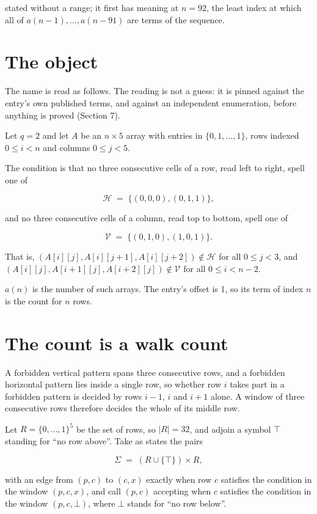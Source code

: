 \documentclass[11pt]{article}
\theoremstyle{definition}
\begin{document}
stated without a range; it first has meaning at $n = 92$, the least index at which all of $a(n-1),\dots,a(n-91)$ are terms of the sequence.

\section{The object}

The name is read as follows. The reading is not a guess: it is pinned against the entry's own published terms, and against an independent enumeration, before anything is proved (Section 7).

Let $q = 2$ and let $A$ be an $n \times 5$ array with entries in $\{0,1,\dots,1\}$, rows indexed $0 \le i < n$ and columns $0 \le j < 5$.

The condition is that no three consecutive cells of a row, read left to right, spell one of

\[\mathcal{H} \;=\; \{(0,0,0), (0,1,1)\},\]

and no three consecutive cells of a column, read top to bottom, spell one of

\[\mathcal{V} \;=\; \{(0,1,0), (1,0,1)\}.\]

That is, $(A[i][j],A[i][j{+}1],A[i][j{+}2]) \notin \mathcal{H}$ for all $0 \le j < 3$, and $(A[i][j],A[i{+}1][j],A[i{+}2][j]) \notin \mathcal{V}$ for all $0 \le i < n-2$.

$a(n)$ is the number of such arrays. The entry's offset is 1, so its term of index $n$ is the count for $n$ rows.

\section{The count is a walk count}

A forbidden vertical pattern spans three consecutive rows, and a forbidden horizontal pattern lies inside a single row, so whether row $i$ takes part in a forbidden pattern is decided by rows $i-1$, $i$ and $i+1$ alone. A window of three consecutive rows therefore decides the whole of its middle row.

Let $R = \{0,\dots,1\}^{5}$ be the set of rows, so $|R| = 32$, and adjoin a symbol $\top$ standing for ``no row above''. Take as states the pairs

\[\Sigma \;=\; (R \cup \{\top\}) \times R,\]

with an edge from $(p,c)$ to $(c,x)$ exactly when row $c$ satisfies the condition in the window $(p,c,x)$, and call $(p,c)$ accepting when $c$ satisfies the condition in the window $(p,c,\bot)$, where $\bot$ stands for ``no row below''.
\end{document}
